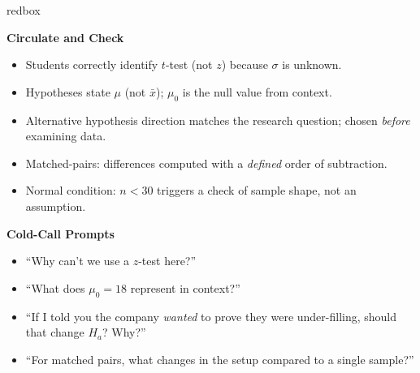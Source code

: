 \documentclass[10pt]{article}
\begin{document}
\begin{skillbox}{redbox}
\begin{minipage}[t]{0.48\linewidth}
    \textbf{Circulate and Check}
    \begin{itemize}
        \item Students correctly identify $t$-test (not $z$) because $\sigma$ is unknown.
        \item Hypotheses state $\mu$ (not $\bar x$); $\mu_0$ is the null value from context.
        \item Alternative hypothesis direction matches the research question; chosen
              \emph{before} examining data.
        \item Matched-pairs: differences computed with a \emph{defined} order of subtraction.
        \item Normal condition: $n < 30$ triggers a check of sample shape, not an assumption.
    \end{itemize}
\end{minipage}
\hfill
\begin{minipage}[t]{0.48\linewidth}
    \textbf{Cold-Call Prompts}
    \begin{itemize}
        \item ``Why can't we use a $z$-test here?''
        \item ``What does $\mu_0 = 18$ represent in context?''
        \item ``If I told you the company \emph{wanted} to prove they were under-filling,
              should that change $H_a$? Why?''
        \item ``For matched pairs, what changes in the setup compared to a single sample?''
    \end{itemize}
\end{minipage}
\end{skillbox}
\end{document}
